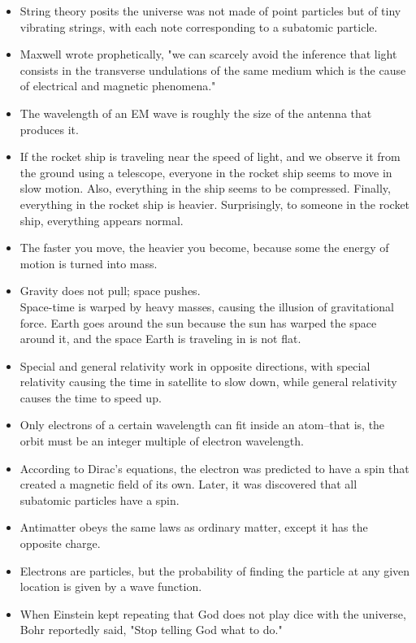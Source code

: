\documentclass[UTF8]{ctexart}
\begin{document}
		\begin{itemize}
			\item String theory posits the universe was not made of point particles but of tiny vibrating strings, with each note corresponding to a subatomic particle.
			\item Maxwell wrote prophetically, "we can scarcely avoid the inference that light consists in the transverse undulations of the same medium which is the cause of electrical and magnetic phenomena."
			\item The wavelength of an EM wave is roughly the size of the antenna that produces it.
			\item If the rocket ship is traveling near the speed of light, and we observe it from the ground using a telescope, everyone in the rocket ship seems to move in slow motion. Also, everything in the ship seems to be compressed. Finally, everything in the rocket ship is heavier. Surprisingly, to someone in the rocket ship, everything appears normal.
			\item The faster you move, the heavier you become, because some the energy of motion is turned into mass.
			\item Gravity does not pull; space pushes.\\
				Space-time is warped by heavy masses, causing the illusion of gravitational force. Earth goes around the sun because the sun has warped the space around it, and the space Earth is traveling in is not flat.
			\item Special and general relativity work in opposite directions, with special relativity causing the time in satellite to slow down, while general relativity causes the time to speed up.
			\item Only electrons of a certain wavelength can fit inside an atom--that is, the orbit must be an integer multiple of electron wavelength.
			\item According to Dirac's equations, the electron was predicted to have a spin that created a magnetic field of its own. Later, it was discovered that all subatomic particles have a spin.
			\item Antimatter obeys the same laws as ordinary matter, except it has the opposite charge.
			\item Electrons are particles, but the probability of finding the particle at any given location is given by a wave function.
			\item When Einstein kept repeating that God does not play dice with the universe, Bohr reportedly said, "Stop telling God what to do."

\end{itemize}
\end{document}
